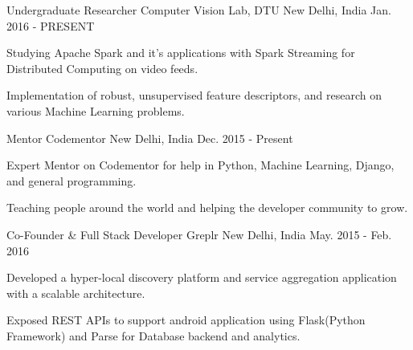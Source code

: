 \begin{cventries}
  \cventry
    {Undergraduate Researcher}
    {Computer Vision Lab, DTU}
    {New Delhi, India}
    {Jan. 2016 - PRESENT}
    {
      \begin{cvitems}
        \item {Studying Apache Spark and it's applications with Spark Streaming for Distributed Computing on video feeds.}
        \item {Implementation of robust, unsupervised feature descriptors, and research on  various Machine Learning problems.}
      \end{cvitems}
    }
  \cventry
    {Mentor}
    {Codementor}
    {New Delhi, India}
    {Dec. 2015 - Present}
    {
      \begin{cvitems}
        \item {Expert Mentor on Codementor for help in Python, Machine Learning, Django, and general programming.}
        \item {Teaching people around the world and helping the developer community to grow.}
      \end{cvitems} 
    }
  \cventry
    {Co-Founder \& Full Stack Developer}
    {Greplr}
    {New Delhi, India}
    {May. 2015 - Feb. 2016}
    {
      \begin{cvitems}
        \item {Developed a hyper-local discovery platform and service aggregation application with a scalable architecture.}
        \item {Exposed REST APIs to support android application using Flask(Python Framework) and Parse for Database backend and analytics.}
      \end{cvitems}
    }
\end{cventries}
